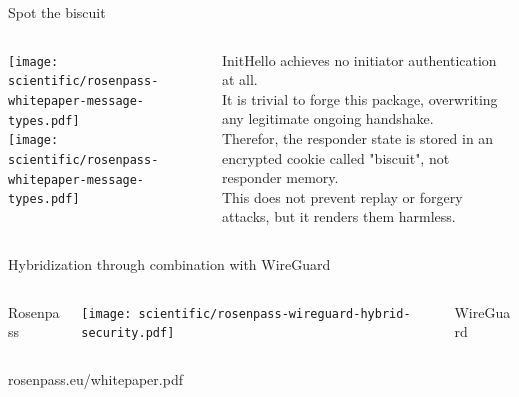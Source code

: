 \begin{frame}{Spot the biscuit}
  \begin{columns}[fullwidth,c]
    \begin{column}{.48\linewidth}
    \centering
    \vspace{.8em}
    \texttt{[image: scientific/rosenpass-whitepaper-message-types.pdf]}
    \\ \texttt{[image: scientific/rosenpass-whitepaper-message-types.pdf]}
    \end{column}

    \begin{column}{.48\linewidth}
        \centering
        InitHello achieves no initiator authentication at all.
        \\[.8em]
        It is trivial to forge this package, overwriting any legitimate ongoing handshake.
        \\[.8em]
        Therefor, the responder state is stored in an encrypted cookie called "biscuit", not responder memory.
        \\[.8em]
        This does not prevent replay or forgery attacks, but it renders them harmless.
    \end{column}
  \end{columns}
\end{frame}

\begin{frame}{Hybridization through combination with WireGuard}
  \begin{columns}[fullwidth,c]
    \begin{column}{.22\linewidth}
      \flushright
      Rosenpass
    \end{column}
    \begin{column}{.65\linewidth}
      \texttt{[image: scientific/rosenpass-wireguard-hybrid-security.pdf]}
    \end{column}
    \begin{column}{.25\linewidth}
      \flushleft
      WireGuard
    \end{column}
  \end{columns}
\end{frame}

\begin{frame}{}
  \centering

  \raggedright
  \footnotesize
  \hspace{-2.5em} rosenpass.eu/whitepaper.pdf
\end{frame}

